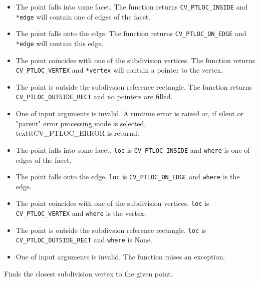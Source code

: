 \ifC
\begin{itemize}
 \item The point falls into some facet. The function returns \texttt{CV\_PTLOC\_INSIDE} and \texttt{*edge} will contain one of edges of the facet.
 \item The point falls onto the edge. The function returns \texttt{CV\_PTLOC\_ON\_EDGE} and \texttt{*edge} will contain this edge.
 \item The point coincides with one of the subdivision vertices. The function returns \texttt{CV\_PTLOC\_VERTEX} and \texttt{*vertex} will contain a pointer to the vertex.
 \item The point is outside the subdivsion reference rectangle. The function returns \texttt{CV\_PTLOC\_OUTSIDE\_RECT} and no pointers are filled.
 \item One of input arguments is invalid. A runtime error is raised or, if silent or "parent" error processing mode is selected, \\texttt{CV\_PTLOC\_ERROR} is returnd.
\end{itemize}
\fi

\ifPython
\begin{itemize}
 \item The point falls into some facet.                          \texttt{loc} is \texttt{CV\_PTLOC\_INSIDE} and \texttt{where} is one of edges of the facet.
 \item The point falls onto the edge.                            \texttt{loc} is \texttt{CV\_PTLOC\_ON\_EDGE} and \texttt{where} is the edge.
 \item The point coincides with one of the subdivision vertices. \texttt{loc} is \texttt{CV\_PTLOC\_VERTEX} and \texttt{where} is the vertex.
 \item The point is outside the subdivsion reference rectangle.  \texttt{loc} is \texttt{CV\_PTLOC\_OUTSIDE\_RECT} and \texttt{where} is None.
 \item One of input arguments is invalid. The function raises an exception.
\end{itemize}
\fi

\label{FindNearestPoint2D}

Finds the closest subdivision vertex to the given point.


